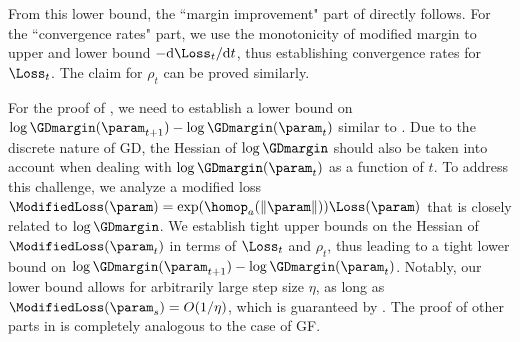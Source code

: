 From this lower bound, the ``margin improvement" part of  directly follows. For the ``convergence rates" part, we use the monotonicity of modified margin to upper and lower bound $- \mathrm{d} \Loss_t / \mathrm{d} t$, thus establishing convergence rates for $\Loss_t$. The claim for $\rho_t$ can be proved similarly.

For the proof of , we need to establish a lower bound on $\log \GDmargin ( \param_{t+1} ) - \log \GDmargin ( \param_{t} )$ similar to . Due to the discrete nature of GD, the Hessian of $\log \GDmargin$ should also be taken into account when dealing with $\log \GDmargin ( \param_{t} )$ as a function of $t$. To address this challenge, we analyze a modified loss $\ModifiedLoss (\param) = \exp(\homop_a(\| \param \|)) \Loss(\param)$ that is closely related to $\log \GDmargin$. We establish tight upper bounds on the Hessian of $\ModifiedLoss (\param_t)$ in terms of $\Loss_t$ and $\rho_t$, thus leading to a tight lower bound on $\log \GDmargin ( \param_{t+1} ) - \log \GDmargin ( \param_{t} )$. Notably, our lower bound allows for arbitrarily large step size $\eta$, as long as $\ModifiedLoss (\param_s) = O(1 / \eta)$, which is guaranteed by . The proof of other parts in   is completely analogous to the case of GF.

